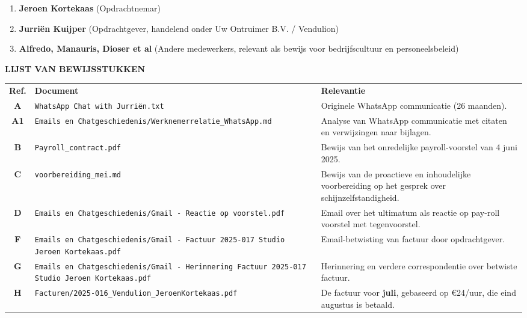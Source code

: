 \documentclass[10pt,a4paper]{article}
\begin{document}
\begin{adjustwidth}{15mm}{15mm}
\begin{enumerate}
\item \textbf{Jeroen Kortekaas} (Opdrachtnemar)
\item \textbf{Jurriën Kuijper} (Opdrachtgever, handelend onder Uw Ontruimer B.V. / Vendulion)
\item \textbf{Alfredo, Manauris, Dioser et al} (Andere medewerkers, relevant als bewijs voor bedrijfscultuur en personeelsbeleid)
\end{enumerate}

\vspace{1em}

{\fontsize{11}{16}\selectfont\textbf{LIJST VAN BEWIJSSTUKKEN}}

\end{adjustwidth}

\begin{longtable}{c>{\raggedright}p{6cm}>{\raggedright\arraybackslash}p{8.5cm}}
\textbf{Ref.} & \textbf{Document} & \textbf{Relevantie} \\[1em]
\textbf{A} & \texttt{WhatsApp Chat with Jurriën.txt} & Originele WhatsApp communicatie (26 maanden). \\[0.5em]
\textbf{A1} & \texttt{Emails en Chatgeschiedenis/Werknemerrelatie\_WhatsApp.md} & Analyse van WhatsApp communicatie met citaten en verwijzingen naar bijlagen. \\[0.5em]
\textbf{B} & \texttt{Payroll\_contract.pdf} & Bewijs van het onredelijke payroll-voorstel van 4 juni 2025. \\[0.5em]
\textbf{C} & \texttt{voorbereiding\_mei.md} & Bewijs van de proactieve en inhoudelijke voorbereiding op het gesprek over schijnzelfstandigheid. \\[0.5em]
\textbf{D} & \texttt{Emails en Chatgeschiedenis/Gmail - Reactie op voorstel.pdf} & Email over het ultimatum als reactie op pay-roll voorstel met tegenvoorstel. \\[0.5em]
\textbf{F} & \texttt{Emails en Chatgeschiedenis/Gmail - Factuur 2025-017 Studio Jeroen Kortekaas.pdf} & Email-betwisting van factuur door opdrachtgever. \\[0.5em]
\textbf{G} & \texttt{Emails en Chatgeschiedenis/Gmail - Herinnering Factuur 2025-017 Studio Jeroen Kortekaas.pdf} & Herinnering en verdere correspondentie over betwiste factuur. \\[0.5em]
\textbf{H} & \texttt{Facturen/2025-016\_Vendulion\_JeroenKortekaas.pdf} & De factuur voor \textbf{juli}, gebaseerd op €24/uur, die eind augustus is betaald. \\[0.5em]

\end{longtable}
\end{document}
